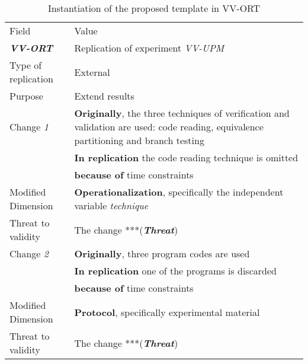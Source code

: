 \begin{table*}[h]
  \caption{Instantiation of the proposed template in VV-ORT}
\label{tab:plantEng}
  \centering

\begin{tabularx}{\textwidth}{
  >{\hsize=0.3\hsize}X
  >{\hsize=0.8\hsize}X}
  
    \noalign{\smallskip}\hline\noalign{\smallskip}
  
  Field &  Value  \\ 
  \noalign{\smallskip}\hline\noalign{\smallskip}
  
 \textbf {\textit{VV-ORT}} & 
 Replication of experiment \textit{VV-UPM} \\ 
  
    Type of replication &  External \\  

    Purpose  &  Extend results \\  \hline
    Change \textit{1}   & \textbf{Originally}, the three techniques of verification and validation are used: code reading, equivalence partitioning and branch testing \\& \textbf{In replication} the code reading technique is omitted \\& \textbf{because of} time constraints \\
    
    Modified Dimension & 
    \textbf{Operationalization}, specifically the independent variable  \textit {technique} \\   
    Threat to validity  & The change ***(\textbf{\textit{Threat}}) \\  \hline
  
    Change \textit{2}   & \textbf{Originally}, three program codes are used \\& \textbf{In replication} one of the programs is  discarded \\& \textbf{because of} time constraints \\  

    Modified Dimension & 
    \textbf{Protocol}, specifically experimental
    material \\   
    Threat to validity  & The change ***(\textbf{\textit{Threat}}) \\  \hline
 

\end{tabularx}
\end{table*}
